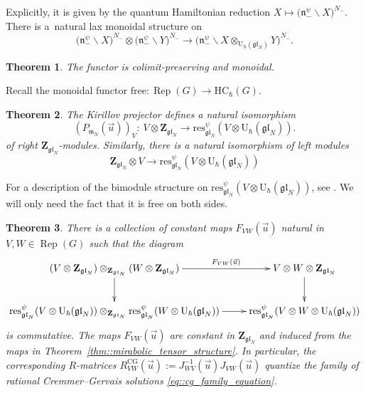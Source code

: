 \documentclass[10pt,a4paper]{article}
\numberwithin{equation}{section}
\newtheorem{Theorem}{Theorem}[section]
\newcommand{\CG}{\mathrm{CG}}
\newcommand{\U}{\mathrm{U}_{\hbar}}
\newcommand{\Z}{\mathbf{Z}}
\newcommand{\n}{\mathfrak{n}}
\newcommand{\m}{\mathfrak{m}}
\newcommand{\free}{\mathrm{free}}
\newcommand{\HC}{\mathrm{HC}_{\hbar}}
\DeclareMathOperator{\Rep}{Rep}
\newcommand{\res}{\mathrm{res}}
\newcommand{\gl}{\mathfrak{gl}}
\begin{document}
	Explicitly, it is given by the quantum Hamiltonian reduction $X \mapsto \bigl(\n_-^{\psi} \backslash X\bigr)^{N_-}$. There is a~natural lax monoidal structure on \smash{$\res_{\gl_N}^{\psi}$}
	\[
	\bigl(\n_-^{\psi} \backslash X\bigr)^{N_-} \otimes \bigl(\n_-^{\psi} \backslash Y\bigr)^{N_-} \rightarrow \bigl(\n_-^{\psi} \backslash X\otimes_{\U(\gl_N)} Y\bigr)^{N_-}.
	\]
	\begin{Theorem}
		\label{thm::kw_exact_monoidal}
		The functor \smash{$\res_{\gl_N}^{\psi}$} is colimit-preserving and monoidal.
	\end{Theorem}
	
	Recall the monoidal functor $\free\colon \Rep(G) \rightarrow \HC(G)$.
	\begin{Theorem}
		\label{thm::kw_trivialization}
		The Kirillov projector defines a natural isomorphism
		\[
		(P_{\m_N} (\vec{u}))_V\colon\ V \otimes \Z_{\gl_N} \rightarrow \res_{\gl_N}^{\psi}(V \otimes \U(\gl_N)).
		\]
		of \emph{right} $\Z_{\gl_N}$-modules. Similarly, there is a natural isomorphism of \emph{left} modules
		\[
		\Z_{\gl_N} \otimes V \rightarrow \res_{\gl_N}^{\psi}(V \otimes \U(\gl_N))
		\]
	\end{Theorem}
	
	\begin{Remark}
		For a description of the bimodule structure on $\res_{\gl_N}^{\psi}(V \otimes \U(\gl_N))$, see \cite{BezrukavnikovFinkelberg}. We will only need the fact that it is free on both sides.
	\end{Remark}
	
	\begin{Theorem}
		\label{thm::kw_tensor_structure}
		There is a collection of \emph{constant} maps $F_{VW}(\vec{u})$ natural in $V,W\in \Rep(G)$ such that the diagram
		\[
		\xymatrix{
			(V \otimes \Z_{\gl_N}) \otimes_{\Z_{\gl_N}} (W \otimes \Z_{\gl_N}) \ar[d] \ar[r]^-{F_{VW}(\vec{u})} & V \otimes W \otimes \Z_{\gl_N} \ar[d] \\
			\res_{\gl_N}^{\psi}(V \otimes \U(\gl_N)) \otimes_{\Z_{\gl_N}} \res_{\gl_N}^{\psi}(W \otimes \U(\gl_N)) \ar[r] & \res_{\gl_N}^{\psi}(V \otimes W \otimes \U(\gl_N))
		}
		\]
		is commutative. The maps $F_{VW}(\vec{u})$ are constant in $\Z_{\gl_N}$ and induced from the maps in Theorem~{\rm\ref{thm::mirabolic_tensor_structure}}. In particular, the corresponding $R$-matrices $R_{VW}^{\CG}(\vec{u}) := J_{WV}^{-1}(\vec{u}) J_{VW}(\vec{u})$ quantize the family of rational Cremmer--Gervais solutions \eqref{eq::cg_family_equation}.
	\end{Theorem}
	
\end{document}
